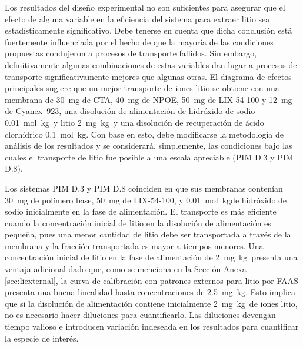 Los resultados del diseño experimental no son suficientes para asegurar que el efecto de alguna variable en la eficiencia del sistema para extraer litio sea estadísticamente significativo. Debe tener\-se en cuenta que dicha conclusión está fuertemente influenciada por el hecho de que la mayo\-ría de las condiciones propuestas condujeron a procesos de transporte fallidos. Sin embargo, definitivamente algunas combinaciones de estas variables dan lugar a procesos de transporte significativamente mejores que algunas otras. El diagrama de efectos principales sugiere que un mejor transporte de iones litio se obtiene con una membrana de 30~mg de CTA, 40~mg de NPOE, 50~mg de LIX-54-100 y 12~mg de Cyanex~923, una disolución de alimentación de hidróxido de sodio 0.01~mol~kg\mnn\ y litio 2~mg~kg\mnn\ y una disolución de recuperación de ácido clorhídrico 0.1~mol~kg\mnn. Con base en esto, debe modificarse la metodología de análisis de los resultados y se considerará, simplemente, las condiciones bajo las cuales el transporte de litio fue posible a una escala apreciable (PIM D.3 y PIM D.8). 

Los sistemas PIM D.3 y PIM D.8 coinciden en que sus membranas contenían 30~mg de polímero base, 50~mg de LIX-54-100, y 0.01~mol~kg\mnn de hidróxido de sodio inicialmente en la fase de alimentación. El transporte es más eficiente cuando la concentración inicial de litio en la disolución de alimentación es pequeña, pues una menor cantidad de litio debe ser transportada a través de la membrana y la fracción transportada es mayor a tiempos menores. Una concentración inicial de litio en la fase de alimentación de 2~mg~kg\mnn\ presenta una ventaja adicional dado que, como se menciona en la Sección Anexa \ref{sec:liexternal}, la curva de calibración con patrones externos para litio por \ac{FAAS} presenta una buena linealidad hasta concentraciones de 2.5~mg~kg\mnn. Esto implica que si la disolución de alimentación contiene inicialmente 2~mg~kg\mnn\ de iones litio, no es necesario hacer diluciones para cuantificarlo. Las diluciones devengan tiempo valioso e introducen variación indeseada en los resultados para cuantificar la especie de interés. 

